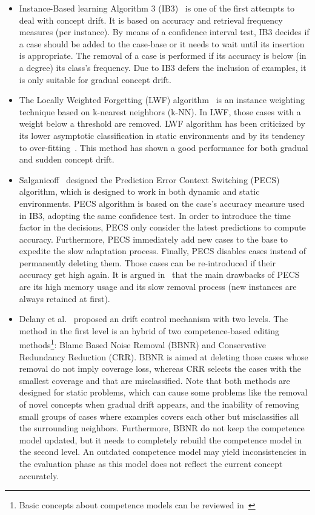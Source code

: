 \documentclass[preprint,12pt]{elsarticle}
\begin{document}
\begin{itemize}
	\item Instance-Based learning Algorithm 3 (IB3)~\cite{aha91} is one of the first attempts to deal with concept drift. It is based on accuracy and retrieval frequency measures (per instance). By means of a confidence interval test, IB3 decides if a case should be added to the case-base or it needs to wait until its insertion is appropriate. The removal of a case is performed if its accuracy is below (in a degree) its class's frequency. Due to IB3 defers the inclusion of examples, it is only suitable for gradual concept drift. 
	\item The Locally Weighted Forgetting (LWF) algorithm~\cite{salga93} is an instance weighting technique based on k-nearest neighbors (k-NN). In LWF, those cases with a weight below a threshold are removed. LWF algorithm has been criticized by its lower asymptotic classification in static environments and by its tendency to over-fitting~\cite{klinken04}. This method has shown a good performance for both gradual and sudden concept drift. 
	\item Salganicoff~\cite{salga97} designed the Prediction Error Context Switching (PECS) algorithm, which is designed to work in both dynamic and static environments. PECS algorithm is based on the case's accuracy measure used in IB3, adopting the same confidence test. In order to introduce the time factor in the decisions, PECS only consider the latest predictions to compute accuracy. Furthermore, PECS immediately add new cases to the base to expedite the slow adaptation process. Finally, PECS disables cases instead of permanently deleting them. Those cases can be re-introduced if their accuracy get high again. It is argued in~\cite{berin07} that the main drawbacks of PECS are its high memory usage and its slow removal process (new instances are always retained at first).
	\item Delany et al.~\cite{delany05} proposed an drift control mechanism with two levels. The method in the first level is an hybrid of two competence-based editing methods\footnote{Basic concepts about competence models can be reviewed in~\cite{smyth95}}: Blame Based Noise Removal (BBNR) and Conservative Redundancy Reduction (CRR). BBNR is aimed at deleting those cases whose removal do not imply coverage loss, whereas CRR selects the cases with the smallest coverage and that are misclassified. Note that both methods are designed for static problems, which can cause some problems like the removal of novel concepts when gradual drift appears, and the inability of removing small groups of cases where examples covers each other but misclassifies all the surrounding neighbors. Furthermore, BBNR do not keep the competence model updated, but it needs to completely rebuild the competence model in the second level. An outdated competence model may yield inconsistencies in the evaluation phase as this model does not reflect the current concept accurately.

\end{itemize}
\end{document}
